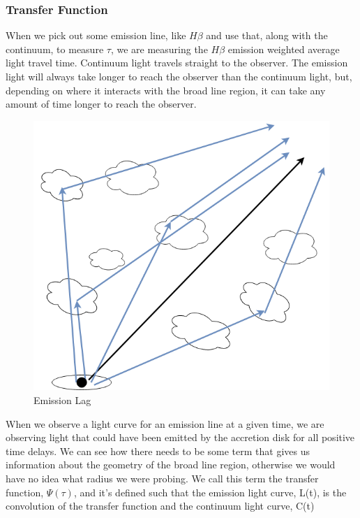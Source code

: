 \documentclass[]{article}
\begin{document}
\hypertarget{transfer-function}{%
\subsubsection{Transfer Function}\label{transfer-function}}

When we pick out some emission line, like \(H\beta\) and use that, along
with the continuum, to measure \(\tau\), we are measuring the \(H\beta\)
emission weighted average light travel time. Continuum light travels
straight to the observer. The emission light will always take longer to
reach the observer than the continuum light, but, depending on where it
interacts with the broad line region, it can take any amount of time
longer to reach the observer.

\begin{figure}
\centering
\includegraphics{./TransferFunction.png}
\caption{Emission Lag}
\end{figure}

When we observe a light curve for an emission line at a given time, we
are observing light that could have been emitted by the accretion disk
for all positive time delays. We can see how there needs to be some term
that gives us information about the geometry of the broad line region,
otherwise we would have no idea what radius we were probing. We call
this term the transfer function, \(\Psi(\tau)\), and it's defined such
that the emission light curve, L(t), is the convolution of the transfer
function and the continuum light curve, C(t)
\end{document}
